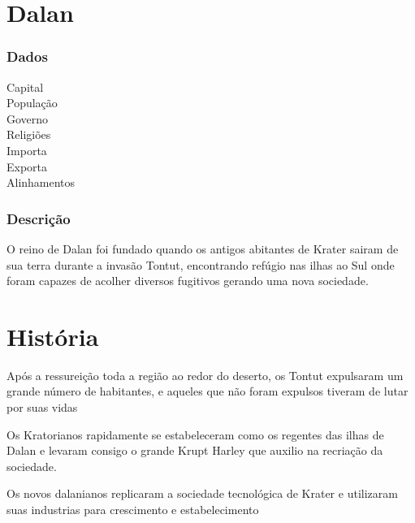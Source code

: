 \section{Dalan}
\subsubsection{Dados}
  \begin{description}
   \item[Capital]
   \item[Popula\c{c}\~ao]
   \item[Governo]
   \item[Religi\~oes]
   \item[Importa]
   \item[Exporta]
   \item[Alinhamentos]
  \end{description}
\subsubsection{Descri\c{c}\~ao}

O reino de Dalan foi fundado quando os antigos abitantes de Krater sairam de sua
terra durante a invas\~{a}o Tontut, encontrando ref\'ugio nas ilhas ao Sul onde
foram capazes de acolher diversos fugitivos gerando uma nova sociedade.

\section{Hist\'oria}

Ap\'os a ressurei\c{c}\~ao toda a regi\~ao ao redor do deserto, os Tontut expulsaram
um grande n\'umero de habitantes, e aqueles que n\~ao foram expulsos tiveram de lutar
por suas vidas

Os Kratorianos rapidamente se estabeleceram como os regentes das ilhas de Dalan e
levaram consigo o grande Krupt Harley que auxilio na recria\c{c}\~ao da sociedade.

Os novos dalanianos replicaram a sociedade tecnol\'ogica de Krater e utilizaram suas
industrias para crescimento e estabelecimento


